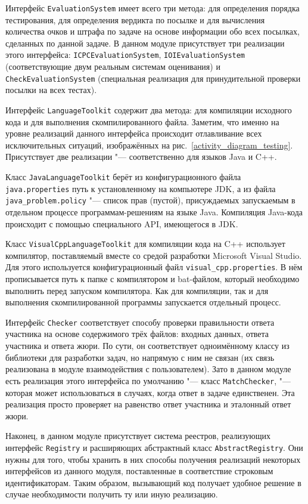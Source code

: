 Интерфейс \texttt{Evaluation\-System} имеет всего три метода: для определения порядка тестирования, для определения вердикта по посылке и для вычисления количества очков и штрафа по задаче на основе информации обо всех посылках, сделанных по данной задаче. В данном модуле присутствует три реализации этого интерфейса: \texttt{ICPC\-Evaluation\-System}, \texttt{IOI\-Evaluation\-System} (соответствующие двум реальным системам оценивания) и \texttt{Check\-Evaluation\-System} (специальная реализация для принудительной проверки посылки на всех тестах).

Интерфейс \texttt{Language\-Toolkit} содержит два метода: для компиляции исходного кода и для выполнения скомпилированного файла. Заметим, что именно на уровне реализаций данного интерфейса происходит отлавливание всех исключительных ситуаций, изображённых на рис.~\ref{activity_diagram_testing}. Присутствует две реализации "--- соответственно для языков Java и C++.

Класс \texttt{Java\-Language\-Toolkit} берёт из конфигурационного файла \texttt{java.pro\-perties} путь к установленному на компьютере JDK, а из файла \texttt{java\_problem.po\-licy} "--- список прав (пустой), присуждаемых запускаемым в отдельном процессе программам-решениям на языке Java. Компиляция Java-кода происходит с помощью специального API, имеющегося в JDK.

Класс \texttt{Visual\-Cpp\-Language\-Toolkit} для компиляции кода на C++ использует компилятор, поставляемый вместе со средой разработки Microsoft Visual Studio. Для этого используется конфигурационный файл \texttt{visual\_cpp.properties}. В нём прописывается путь к папке с компилятором и bat-файлом, который необходимо выполнить перед запуском компилятора. Как для компиляции, так и для выполнения скомпилированной программы запускается отдельный процесс.

Интерфейс \texttt{Checker} соответствует способу проверки правильности ответа участника на основе содержимого трёх файлов: входных данных, ответа участника и ответа жюри. По сути, он соответствует одноимённому классу из библиотеки для разработки задач, но напрямую с ним не связан (их связь реализована в модуле взаимодействия с пользователем). Зато в данном модуле есть реализация этого интерфейса по умолчанию "--- класс \texttt{MatchChecker}, "--- которая может использоваться в случаях, когда ответ в задаче единственен. Эта реализация просто проверяет на равенство ответ участника и эталонный ответ жюри.

Наконец, в данном модуле присутствует система реестров, реализующих интерфейс \texttt{Registry} и расширяющих абстрактный класс \texttt{AbstractRegistry}. Они нужны для того, чтобы хранить в них способы получения реализаций некоторых интерфейсов из данного модуля, поставленные в соответствие строковым идентификаторам. Таким образом, вызывающий код получает удобное решение в случае необходимости получить ту или иную реализацию.